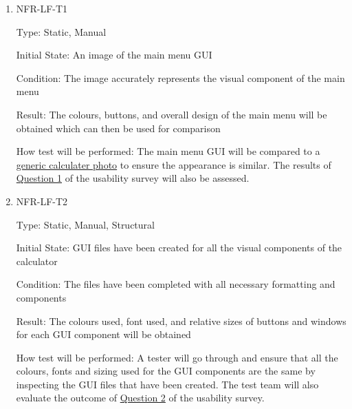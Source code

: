 \documentclass[12pt, titlepage]{article}
\begin{document}
\begin{enumerate}

\item{NFR-LF-T1\\}

Type: Static, Manual
					
Initial State: An image of the main menu GUI 
					
Condition: The image accurately represents the visual component of the main menu
					
Result: The colours, buttons, and overall design of the main menu will be obtained which can then be used for comparison
					
How test will be performed: The main menu GUI will be compared to a \hyperref[calc]{generic calculater photo} to ensure the appearance is similar. The results of \hyperref[sec:survey]{Question 1} of the usability survey will also be assessed.
					
\item{NFR-LF-T2\\}

Type: Static, Manual, Structural
					
Initial State: GUI files have been created for all the visual components of the calculator
					
Condition: The files have been completed with all necessary formatting and components
					
Result: The colours used, font used, and relative sizes of buttons and windows for each GUI component will be obtained
					
How test will be performed: A tester will go through and ensure that all the colours, fonts and sizing used for the GUI components are the same by inspecting the GUI files that have been created. The test team will also evaluate the outcome of \hyperref[sec:survey]{Question 2} of the usability survey.

\end{enumerate}
\end{document}
